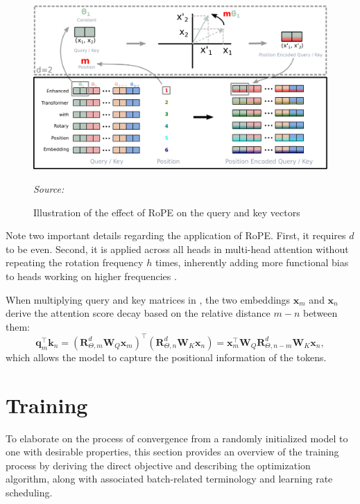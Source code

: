 \begin{figure}[ht]
    \centering
    \includegraphics[width=\textwidth]{figures/rope.pdf}
    \caption{Illustration of the effect of RoPE on the query and key vectors}\label{fig:rope}
    \hfill\textit{Source: \citet{su2021}}
\end{figure}

Note two important details regarding the application of RoPE. First, it requires \(d\) to be even. Second, it is applied across all heads in multi-head attention without repeating the rotation frequency \(h\) times, inherently adding more functional bias to heads working on higher frequencies \parencite{barbero2024}.

When multiplying query and key matrices in , the two embeddings \(\mathbf{x}_m\) and \(\mathbf{x}_n\) derive the attention score decay based on the relative distance \(m-n\) between them:
\begin{equation}
	\mathbf{q}_m^{\top}\mathbf{k}_n
	=(\mathbf{R}^d_{\Theta, m}\mathbf{W}_Q\mathbf{x}_m)^\top(\mathbf{R}^d_{\Theta, n}\mathbf{W}_K\mathbf{x}_n) =\mathbf{x}_m^\top\mathbf{W}_Q\mathbf{R}^d_{\Theta, n-m}\mathbf{W}_K\mathbf{x}_n,
\end{equation}
which allows the model to capture the positional information of the tokens.

\section{Training}

To elaborate on the process of convergence from a randomly initialized model to one with desirable properties, this section provides an overview of the training process by deriving the direct objective and describing the optimization algorithm, along with associated batch-related terminology and learning rate scheduling.

